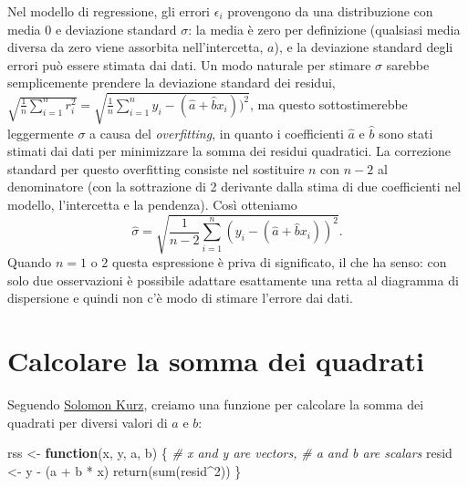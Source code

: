 \documentclass[
  10pt,
  italian,
  a4paper,
  extrafontsizes,onecolumn,openright
  ]{memoir}
\newenvironment{Shaded}{\begin{snugshade}}{\end{snugshade}}
\newcommand{\CommentTok}[1]{\textcolor[rgb]{0.56,0.35,0.01}{\textit{#1}}}
\newcommand{\ControlFlowTok}[1]{\textcolor[rgb]{0.13,0.29,0.53}{\textbf{#1}}}
\newcommand{\DecValTok}[1]{\textcolor[rgb]{0.00,0.00,0.81}{#1}}
\newcommand{\FunctionTok}[1]{\textcolor[rgb]{0.00,0.00,0.00}{#1}}
\newcommand{\NormalTok}[1]{#1}
\newcommand{\OtherTok}[1]{\textcolor[rgb]{0.56,0.35,0.01}{#1}}
\newcommand{\SpecialCharTok}[1]{\textcolor[rgb]{0.00,0.00,0.00}{#1}}
\newlength{\rf}
\begin{document}
Nel modello di regressione, gli errori \(\epsilon_i\) provengono da una distribuzione con media 0 e deviazione standard \(\sigma\): la media è zero per definizione (qualsiasi media diversa da zero viene assorbita nell'intercetta, \(a\)), e la deviazione standard degli errori può essere stimata dai dati. Un modo naturale per stimare \(\sigma\) sarebbe semplicemente prendere la deviazione standard dei residui, \(\sqrt{\frac{1}{n} \sum_{i=1}^n r_i^2} = \sqrt{ \frac{1}{n} \sum_{i=1}^n y_i - (\hat{a} + \hat{b} x_i))^2}\), ma questo sottostimerebbe leggermente \(\sigma\) a causa del \emph{overfitting}, in quanto i coefficienti \(\hat{a}\) e \(\hat{b}\) sono stati stimati dai dati per minimizzare la somma dei residui quadratici. La correzione standard per questo overfitting consiste nel sostituire \(n\) con \(n - 2\) al denominatore (con la sottrazione di 2 derivante dalla stima di due coefficienti nel modello, l'intercetta e la pendenza). Così otteniamo
\[
\hat{\sigma} = \sqrt{\frac{1}{n-2} \sum_{i=1}^n (y_i - (\hat{a} + \hat{b} x_i))^2}.
\]
Quando \(n = 1\) o \(2\) questa espressione è priva di significato, il che ha senso: con solo due osservazioni è possibile adattare esattamente una retta al diagramma di dispersione e quindi non c'è modo di stimare l'errore dai dati.

\hypertarget{calcolare-la-somma-dei-quadrati}{%
\section{Calcolare la somma dei quadrati}\label{calcolare-la-somma-dei-quadrati}}

Seguendo \href{https://github.com/ASKurz/Working-through-Regression-and-other-stories/blob/main/08.Rmd}{Solomon Kurz}, creiamo una funzione per calcolare la somma dei quadrati per diversi valori di \(a\) e \(b\):

\begin{Shaded}
\begin{Highlighting}[]
\NormalTok{rss }\OtherTok{\textless{}{-}} \ControlFlowTok{function}\NormalTok{(x, y, a, b) \{  }
  \CommentTok{\# x and y are vectors, }
  \CommentTok{\# a and b are scalars }
\NormalTok{  resid }\OtherTok{\textless{}{-}}\NormalTok{ y }\SpecialCharTok{{-}}\NormalTok{ (a }\SpecialCharTok{+}\NormalTok{ b }\SpecialCharTok{*}\NormalTok{ x)}
  \FunctionTok{return}\NormalTok{(}\FunctionTok{sum}\NormalTok{(resid}\SpecialCharTok{\^{}}\DecValTok{2}\NormalTok{))}
\NormalTok{  \}}
\end{Highlighting}
\end{Shaded}
\end{document}
